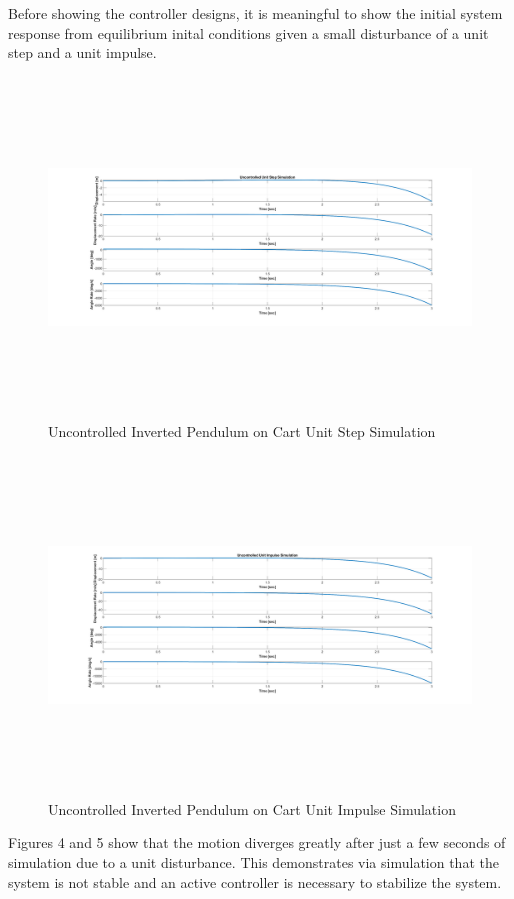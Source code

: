 \documentclass[titlepage]{article}
\begin{document}
Before showing the controller designs, it is meaningful to show the initial system response from equilibrium inital conditions given a small disturbance of a unit step and a unit impulse.

\begin{figure}[H]
\center
\includegraphics[width=15cm, height=9cm]{uncontrolled_unit_step.png}
\caption{Uncontrolled Inverted Pendulum on Cart Unit Step Simulation}
\end{figure}

\begin{figure}[H]
\center
\includegraphics[width=15cm, height=9cm]{uncontrolled_unit_impulse.png}
\caption{Uncontrolled Inverted Pendulum on Cart Unit Impulse Simulation}
\end{figure}

Figures 4 and 5 show that the motion diverges greatly after just a few seconds of simulation due to a unit disturbance. This demonstrates via simulation that the system is not stable and an active controller is necessary to stabilize the system.
\end{document}
